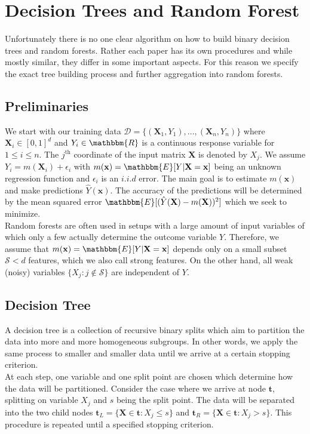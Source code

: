 \par{
\section{Decision Trees and Random Forest}

Unfortunately there is no one clear algorithm on how to build binary decision trees and random forests. Rather each paper has its own procedures and while mostly similar, they differ in some important aspects. For this reason we specify the exact tree building process and further aggregation into random forests. 

\subsection{Preliminaries}

We start with our training data $\mathcal{D} = \{(\mathbf{X}_1, Y_1), ..., (\mathbf{X}_n, Y_n)\}$ where $\mathbf{X}_i \in [0, 1]^d$ and $Y_i \in \mathbbm{R}$ is a continuous response variable for $1 \leq i \leq n$. The $j^{\text{th}}$ coordinate of the input matrix $\mathbf{X}$ is denoted by $X_j$. We assume $Y_i = m(\mathbf{X}_i) + \epsilon_i$ with $m(\mathbf{x}) = \mathbbm{E}[Y | \mathbf{X} = \mathbf{x}]$ being an unknown regression function and $\epsilon_i$ is an $i.i.d$ error. The main goal is to estimate $m(\mathbf{x})$ and make predictions $\hat{Y}(\mathbf{x})$. The accuracy of the predictions will be determined by the mean squared error $\mathbbm{E}[(\hat{Y}(\mathbf{X}) - m(\mathbf{X}))^2]$ which we seek to minimize. \\
Random forests are often used in setups with a large amount of input variables of which only a few actually determine the outcome variable $Y$. Therefore, we assume that $m(\mathbf{x}) = \mathbbm{E}[Y | \mathbf{X} = \mathbf{x}]$ depends only on a small subset $\mathcal{S} < d$ features, which we also call strong features. On the other hand, all weak (noisy) variables $\{X_j: j \notin \mathcal{S} \}$ are independent of $Y$.

\subsection{Decision Tree}
A decision tree is a collection of recursive binary splits which aim to partition the data into more and more homogeneous subgroups. 
In other words, we apply the same process to smaller and smaller data until we arrive at a certain stopping criterion. \\
At each step, one variable and one split point are chosen which determine how the data will be partitioned. Consider the case where we arrive at node $\mathbf{t}$, splitting on variable $X_j$ and $s$ being the split point. The data will be separated into the two child nodes $\mathbf{t}_L = \{ \mathbf{X} \in \mathbf{t}: X_j \leq s \}$ and $\mathbf{t}_R = \{ \mathbf{X} \in \mathbf{t}: X_j > s \}$. This procedure is repeated until a specified stopping criterion. \\

}
